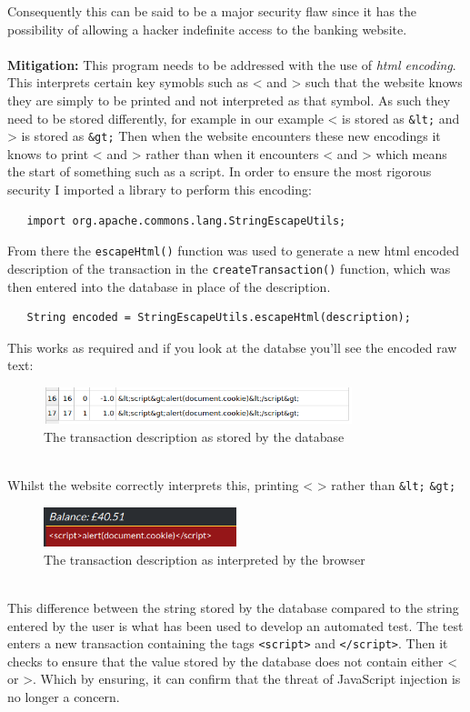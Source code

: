 Consequently this can be said to be a major security flaw since it has the possibility of allowing a hacker indefinite access to the banking website.\\ \\
\textbf{Mitigation:} This program needs to be addressed with the use of \textit{html encoding}. This interprets certain key symobls such as < and > such that the website knows
they are simply to be printed and not interpreted as that symbol. As such they need to be stored differently, for example in our example < is stored as \verb|&lt;| and > is stored as
\verb|&gt;| Then when the website encounters these new encodings it knows to print < and > rather than when it encounters < and > which means the start of something such as a
script. In order to ensure the most rigorous security I imported a library to perform this encoding:
\begin{verbatim}
   import org.apache.commons.lang.StringEscapeUtils;
\end{verbatim}
From there the \verb|escapeHtml()| function was used to generate a new html encoded description of the transaction in the \verb|createTransaction()| function, which was then
entered into the database in place of the description.
\begin{verbatim}
   String encoded = StringEscapeUtils.escapeHtml(description);
\end{verbatim}
This works as required and if you look at the databse you'll see the encoded raw text:
\begin{figure}[h]
   \centering
   \includegraphics[width=0.8\textwidth]{figs/database.png}
   \caption{The transaction description as stored by the database}
   \label{fig2}
\end{figure}\\
Whilst the website correctly interprets this, printing < > rather than \verb|&lt;| \verb|&gt;|
\begin{figure}[h]
   \centering
   \includegraphics[width=0.5\textwidth]{figs/websitejs.png}
   \caption{The transaction description as interpreted by the browser}
   \label{fig3}
\end{figure}\\
This difference between the string stored by the database compared to the string entered by the user is what has been used to develop an automated test. The test enters a new
transaction containing the tags \verb|<script>| and \verb|</script>|. Then it checks to ensure that the value stored by the database does not contain either < or >. Which by
ensuring, it can confirm that the threat of JavaScript injection is no longer a concern.
 
